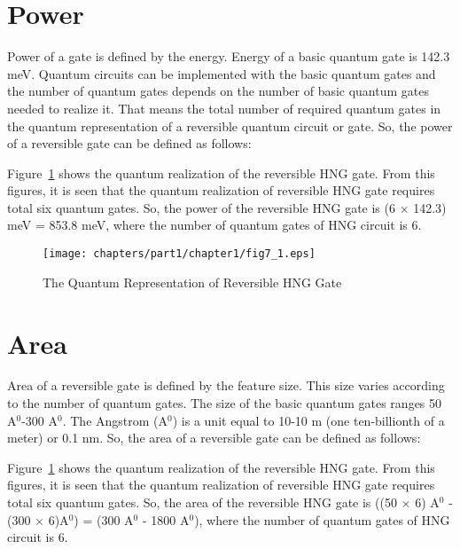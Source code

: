 \section{Power}
Power of a gate is defined by the energy. Energy of a basic quantum gate is 142.3 meV. Quantum circuits can be implemented with the basic quantum gates and the number of quantum gates depends on the number of basic quantum gates needed to realize it. That means the total number of required quantum gates in the quantum representation of a reversible quantum circuit or gate. So, the power of a reversible gate can be defined as follows:


\begin{example}\textnormal{
Figure~\ref{fig:p1_c1_fig7_1} shows the quantum realization of the reversible HNG gate. From this figures, it is seen that the quantum realization of reversible HNG gate requires total six quantum gates. So, the power of the reversible HNG gate is (6 $\times$ 142.3) meV = 853.8 meV, where the number of quantum gates of HNG circuit is 6.}
\end{example}


\begin{figure}[H]
\centering
\texttt{[image: chapters/part1/chapter1/fig7\_1.eps]}
\caption{The Quantum Representation of Reversible HNG Gate}
\label{fig:p1_c1_fig7_1}
\end{figure}

\section{Area}
Area of a reversible gate is defined by the feature size. This size varies according to the number of quantum gates. The size of the basic quantum gates ranges 50 A$^0$-300 A$^0$. The Angstrom (A$^0$) is a unit equal to 10-10 m (one ten-billionth of a meter) or 0.1 nm. So, the area of a reversible gate can be defined as follows:


\begin{example}\textnormal{
Figure~\ref{fig:p1_c1_fig7_1} shows the quantum realization of the reversible HNG gate. From this figures, it is seen that the quantum realization of reversible HNG gate requires total six quantum gates. So, the area of the reversible HNG gate is ((50 $\times$ 6) A$^0$ - (300 $\times$ 6)A$^0$) = (300 A$^0$ - 1800 A$^0$), where the number of quantum gates of HNG circuit is 6.}
\end{example}


